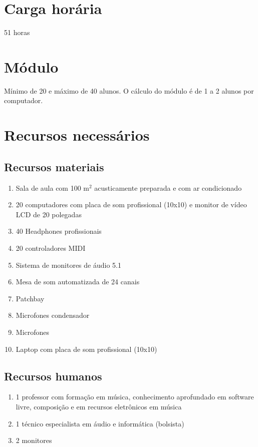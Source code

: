 \documentclass[12pt]{article}
\begin{document}
\section{Carga horária}

51 horas
 
\section{Módulo}

Mínimo de 20 e máximo de 40 alunos. O cálculo do módulo é de 1 a 2
alunos por computador.

\section{Recursos necessários}
\label{sec:material}

\subsection{Recursos materiais}

\begin{enumerate}
\item Sala de aula com 100 m$^2$ acusticamente preparada e com ar
  condicionado
\item 20 computadores com placa de som profissional (10x10) e monitor
  de vídeo LCD de 20 polegadas
\item 40 Headphones profissionais
\item 20 controladores MIDI
\item Sistema de monitores de áudio 5.1
\item Mesa de som automatizada de 24 canais
\item Patchbay
\item Microfones condensador
\item Microfones
\item Laptop com placa de som profissional (10x10)
\end{enumerate}

\subsection{Recursos humanos}

\begin{enumerate}
\item 1 professor com formação em música, conhecimento aprofundado em
  software livre, composição e em recursos eletrônicos em música
\item 1 técnico especialista em áudio e informática (bolsista)
\item 2 monitores
\end{enumerate}
\end{document}
